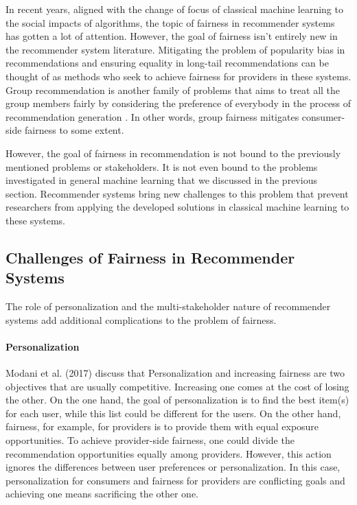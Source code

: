     In recent years, aligned with the change of focus of classical machine learning to the social impacts of algorithms, the topic of fairness in recommender systems has gotten a lot of attention. However, the goal of fairness isn't entirely new in the recommender system literature. Mitigating the problem of popularity bias in recommendations \cite{popbias2018} and ensuring equality in long-tail recommendations \cite{ferraro2019} can be thought of as methods who seek to achieve fairness for providers in these systems. Group recommendation is another family of problems that aims to treat all the group members fairly by considering the preference of everybody in the process of recommendation generation \cite{kaya2020}. In other words, group fairness mitigates consumer-side fairness to some extent. 
    
    However, the goal of fairness in recommendation is not bound to the previously mentioned problems or stakeholders. It is not even bound to the problems investigated in general machine learning that we discussed in the previous section. Recommender systems bring new challenges to this problem that prevent researchers from applying the developed solutions in classical machine learning to these systems. 

    \subsection{Challenges of Fairness in Recommender Systems}
        The role of personalization and the multi-stakeholder nature of recommender systems add additional complications to the problem of fairness.
        
        \vspace{0.25cm}
        \noindent \paragraph{Personalization}
        \vspace{0.25cm}
    
            Modani et al. (2017) \cite{modani2017fairness} discuss that Personalization and increasing fairness are two objectives that are usually competitive. Increasing one comes at the cost of losing the other. On the one hand, the goal of personalization is to find the best item(s) for each user, while this list could be different for the users. On the other hand, fairness, for example, for providers is to provide them with equal exposure opportunities. To achieve provider-side fairness, one could divide the recommendation opportunities equally among providers. However, this action ignores the differences between user preferences or personalization. In this case, personalization for consumers and fairness for providers are conflicting goals and achieving one means sacrificing the other one.
            
